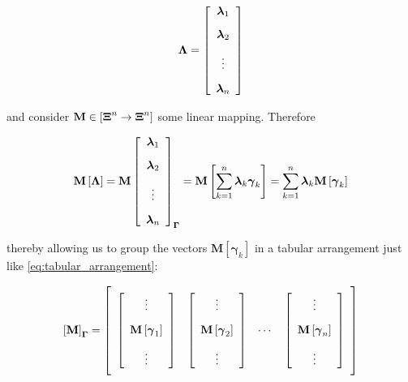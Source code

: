 \begin{equation} \boldsymbol{\Lambda} = \left[\begin{array}{c} \boldsymbol{\lambda}_{1} \\[3mm] \boldsymbol{\lambda}_{2} \\[3mm] \vdots \\[3mm] \boldsymbol{\lambda}_{n} \end{array}\right] \end{equation}

	\noindent and consider $\mathbf{M}\in\left[\boldsymbol{\Xi}^n\to\boldsymbol{\Xi}^n\right]$ some linear mapping. Therefore

\begin{equation} \mathbf{M}\left[\boldsymbol{\Lambda}\right] = \mathbf{M}\left[\begin{array}{c} \boldsymbol{\lambda}_{1} \\[3mm] \boldsymbol{\lambda}_{2} \\[3mm] \vdots \\[3mm] \boldsymbol{\lambda}_{n} \end{array}\right]_{\boldsymbol{\Gamma}} = \mathbf{M}\left[\sum\limits_{k=1}^n \boldsymbol{\lambda}_k \boldsymbol{\gamma}_k \right] = \sum_{k=1}^n \boldsymbol{\lambda}_k \mathbf{M}\left[\boldsymbol{\gamma}_k\right] \end{equation}

	\noindent thereby allowing us to group the vectors $\mathbf{M}\left[\boldsymbol{\gamma}_k\right]$ in a tabular arrangement just like \eqref{eq:tabular_arrangement}:

\begin{equation} \left[\mathbf{M}\right]_{\boldsymbol{\Gamma}} = \left[\raisebox{15mm}{} \begin{array}{cccc} \left[\begin{array}{c} \vdots \\[3mm] \mathbf{M}\left[\boldsymbol{\gamma}_1\right] \\[3mm] \vdots \end{array}\right] & \left[\begin{array}{c} \vdots \\[3mm] \mathbf{M}\left[\boldsymbol{\gamma}_2\right] \\[3mm] \vdots \end{array}\right] & \cdots & \left[\begin{array}{c} \vdots \\[3mm] \mathbf{M}\left[\boldsymbol{\gamma}_n\right] \\[3mm] \vdots \end{array}\right]\end{array}\right]\end{equation}

